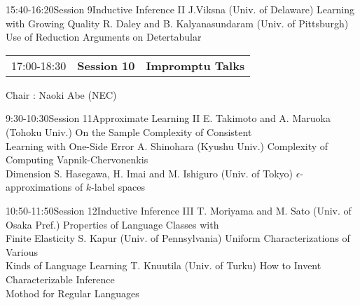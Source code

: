 
\begin{session}{15:40-16:20}{Session 9}{Inductive Inference II}
\talk
{J.Viksna (Univ. of Delaware)}
{Learning with Growing Quality}
\talk
{R. Daley and B. Kalyanasundaram (Univ. of Pittsburgh)}
{Use of Reduction Arguments on Detertabular}
\end{session}


\vspace{3mm}
\begin{tabular}{llp{50mm}}
17:00-18:30 & \bf Session 10 & \bf Impromptu Talks
\end{tabular}
\par\vspace{-1mm}
\begin{flushright}\scriptsize
Chair : Naoki Abe (NEC)
\end{flushright}

\vspace{5mm}


\begin{session}{9:30-10:30}{Session 11}{Approximate Learning II}
\talk
{E. Takimoto and A. Maruoka (Tohoku Univ.)}
{On the Sample Complexity of Consistent \\
 Learning with One-Side Error}
\talk
{A. Shinohara (Kyushu Univ.)}
{Complexity of Computing Vapnik-Chervonenkis \\ Dimension}
\talk
{S. Hasegawa, H. Imai and M. Ishiguro (Univ. of Tokyo)}
{$\epsilon$-approximations of $k$-label spaces}
\end{session}


\begin{session}{10:50-11:50}{Session 12}{Inductive Inference III}
\talk
{T. Moriyama and M. Sato (Univ. of Osaka Pref.)}
{Properties of Language Classes with \\
 Finite Elasticity}
\talk
{S. Kapur (Univ. of Pennsylvania)}
{Uniform Characterizations of Various \\
 Kinds of Language Learning}
\talk
{T. Knuutila (Univ. of Turku)}
{How to Invent Characterizable Inference \\
 Mothod for Regular Languages}
\end{session}


